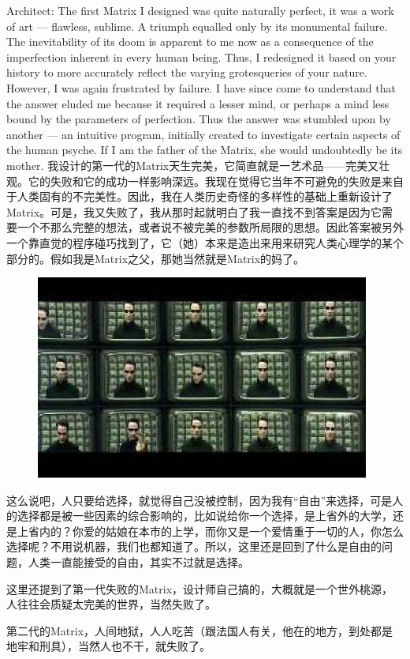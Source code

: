 \documentclass{ctexart}
\begin{document}
Architect: The first Matrix I designed was quite naturally perfect, it was a work of art --- flawless, sublime. A triumph equalled only by its monumental failure. The inevitability of its doom is apparent to me now as a consequence of the imperfection inherent in every human being. Thus, I redesigned it based on your history to more accurately reflect the varying grotesqueries of your nature. However, I was again frustrated by failure. I have since come to understand that the answer eluded me because it required a lesser mind, or perhaps a mind less bound by the parameters of perfection. Thus the answer was stumbled upon by another --- an intuitive program, initially created to investigate certain aspects of the human psyche. If I am the father of the Matrix, she would undoubtedly be its mother. 我设计的第一代的Matrix天生完美，它简直就是一艺术品——完美又壮观。它的失败和它的成功一样影响深远。我现在觉得它当年不可避免的失败是来自于人类固有的不完美性。因此，我在人类历史奇怪的多样性的基础上重新设计了Matrix。可是，我又失败了，我从那时起就明白了我一直找不到答案是因为它需要一个不那么完整的想法，或者说不被完美的参数所局限的思想。因此答案被另外一个靠直觉的程序碰巧找到了，它（她）本来是造出来用来研究人类心理学的某个部分的。假如我是Matrix之父，那她当然就是Matrix的妈了。

\begin{figure}[htb]
\centering
\includegraphics[width=0.5\linewidth]{fig/read_reloaded-162}
\end{figure}

这么说吧，人只要给选择，就觉得自己没被控制，因为我有“自由”来选择，可是人的选择都是被一些因素的综合影响的，比如说给你一个选择，是上省外的大学，还是上省内的？你爱的姑娘在本市的上学，而你又是一个爱情重于一切的人，你怎么选择呢？不用说机器，我们也都知道了。所以，这里还是回到了什么是自由的问题，人类一直能接受的自由，其实不过就是选择。

这里还提到了第一代失败的Matrix，设计师自己搞的，大概就是一个世外桃源，人往往会质疑太完美的世界，当然失败了。

第二代的Matrix，人间地狱，人人吃苦（跟法国人有关，他在的地方，到处都是地牢和刑具），当然人也不干，就失败了。
\end{document}
